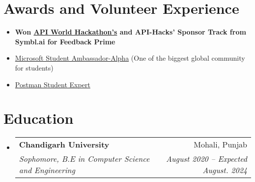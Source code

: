 \documentclass[letterpaper,11pt]{article}
\makeatletter
\newcommand{\resumeItem}[1]{
  \item\small{
    {#1 \vspace{-2pt}}
  }
}
\newcommand{\resumeSubheading}[4]{
  \vspace{-2pt}\item
    \begin{tabular*}{0.97\textwidth}[t]{l@{\extracolsep{\fill}}r}
      \textbf{#1} & #2 \\
      \textit{\small#3} & \textit{\small #4} \\
    \end{tabular*}\vspace{-7pt}
}
\newcommand{\resumeSubHeadingListStart}{\begin{itemize}[leftmargin=0.15in, label={}]}
\newcommand{\resumeSubHeadingListEnd}{\end{itemize}}
\newcommand{\resumeItemListStart}{\begin{itemize}}
\newcommand{\resumeItemListEnd}{\end{itemize}\vspace{-5pt}}
\makeatother
\begin{document}
\section{Awards and Volunteer Experience }
 \begin{itemize}[leftmargin=0.15in, label={}]
    \small{\item{
        \resumeItemListStart
                \resumeItem{\textbf{{Won \href{https://devpost.com/software/feedback-prime-kbg8um}{\color{blue}API World Hackathon's} and API-Hacks' Sponsor Track from Symbl.ai for Feedback Prime} }}
                \resumeItem{\href{https://studentambassadors.microsoft.com/en-US/profile/124303}{\color{blue}Microsoft Student Ambassador-Alpha} (One of the biggest global community for students) }
                \resumeItem{\href{https://api.badgr.io/public/assertions/smxpDApNQkawRdyLq88rTA}{ \color{blue}Postman Student Expert}}
      \resumeItemListEnd
    }}
 \end{itemize}
 
\section{Education}
  \resumeSubHeadingListStart
    \resumeSubheading
      {Chandigarh University}{Mohali, Punjab}
      {Sophomore, B.E in Computer Science and Engineering}{August 2020 -- Expected August. 2024}
  \resumeSubHeadingListEnd
\end{document}
